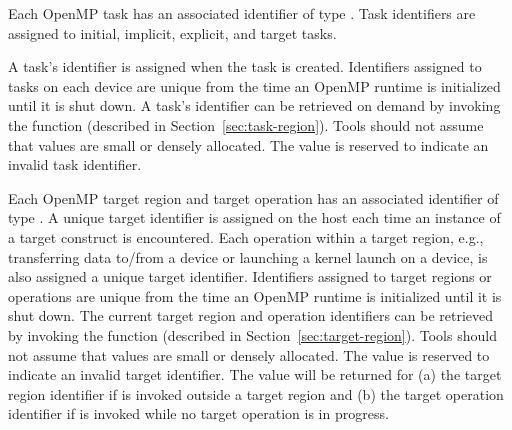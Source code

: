 Each OpenMP task has an associated identifier of type
. Task identifiers are assigned to
initial, implicit, explicit, and target tasks.
\begin{comment}
\begin{boxedcode}
typedef uint64\_t ompt\_task\_id\_t;
\end{boxedcode}
\end{comment}
  A task's identifier is assigned
  when the task is created.
  Identifiers assigned to tasks on each device are unique from the time an
  OpenMP runtime is initialized until it is shut down.
  A task's identifier can be retrieved
  on demand by invoking the   function (described in Section~\ref{sec:task-region}).
  Tools should not assume that  values are small or densely allocated.
  The value  is reserved to indicate an invalid task identifier.

Each OpenMP target region and target operation has an associated identifier of type .
A unique target identifier is assigned on the host each time an instance of a target construct is encountered.
Each operation within a target region, e.g., transferring data to/from a device or launching a kernel launch
on a device, is also assigned a unique target identifier.
Identifiers assigned to target regions or operations
are unique from the time an OpenMP runtime is initialized until it is shut down.
The current target region and operation identifiers can be retrieved by invoking the  function (described in Section~\ref{sec:target-region}).
Tools should not assume that  values are small or densely allocated.
The value  is reserved to indicate an invalid target identifier.
The value  will be returned for (a) the target region identifier if  is invoked outside a target region and (b) the target operation identifier if  is invoked while no target operation is in progress.


